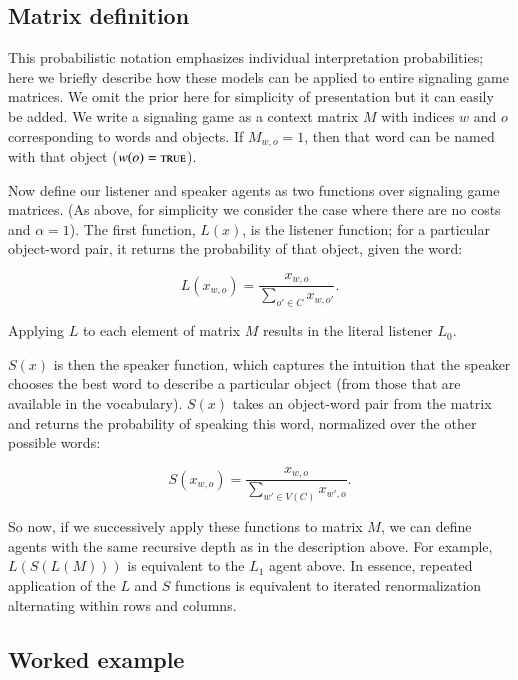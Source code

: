 \documentclass[man,noapacite]{apa2}
\begin{document}
\subsection{Matrix definition}

This probabilistic notation emphasizes individual interpretation probabilities; here we briefly describe how these models can be applied to entire signaling game matrices. We omit the prior here for simplicity of presentation but it can easily be added. We write a signaling game as a context matrix $M$ with indices $w$ and $o$ corresponding to words and objects. If $M_{w,o} = 1$, then that word can be named with that object ($w(o) = \textsc{true}$).

Now define our listener and speaker agents as two functions over signaling game matrices. (As above, for simplicity we consider the case where there are no costs and $\alpha=1$). The first function, $L(x)$, is the listener function; for a particular object-word pair, it returns the probability of that object, given the word:

\begin{equation}
  \label{eq:lmatrix}
L(x_{w,o}) = \frac{x_{w,o}}{\displaystyle\sum_{o' \in C} x_{w,o'} }.
\end{equation}

\noindent Applying $L$ to each element of matrix $M$ results in the literal listener $L_0$.

$S(x)$ is then the speaker function, which captures the intuition that the speaker chooses the best word to describe a particular object (from those that are available in the vocabulary). $S(x)$ takes an object-word pair from the matrix and returns the probability of speaking this word, normalized over the other possible words:

\begin{equation}
  \label{eq:smatrix}
S(x_{w,o}) = \frac{x_{w,o}}{\displaystyle \sum_{w' \in V(C)} x_{w',o}}.
\end{equation}

So now, if we successively apply these functions to matrix $M$, we can define agents with the same recursive depth as in the description above. For example, $L(S(L(M)))$ is equivalent to the $L_1$ agent above. In essence, repeated application of the $L$ and $S$ functions is equivalent to iterated renormalization alternating within rows and columns.

\subsection{Worked example}
\end{document}

